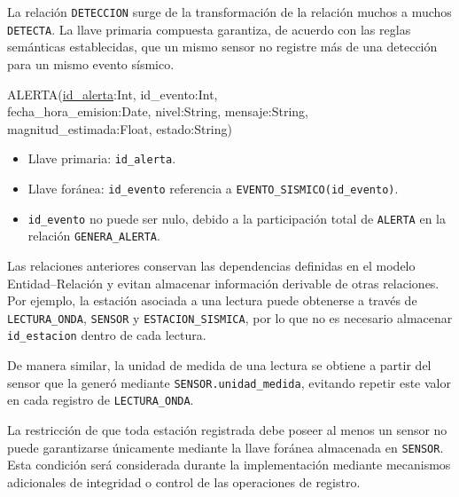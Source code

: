 \documentclass[12pt,a4paper]{article}
\begin{document}
La relación \texttt{DETECCION} surge de la transformación de la relación muchos a muchos \texttt{DETECTA}. La llave primaria compuesta garantiza, de acuerdo con las reglas semánticas establecidas, que un mismo sensor no registre más de una detección para un mismo evento sísmico.

\noindent
\begin{minipage}{\linewidth}
\small\ttfamily\raggedright
ALERTA(\underline{id\_alerta}:Int, id\_evento:Int,\\
fecha\_hora\_emision:Date, nivel:String, mensaje:String,\\
magnitud\_estimada:Float, estado:String)
\end{minipage}
\par\medskip

\begin{itemize}
    \item Llave primaria: \texttt{id\_\allowbreak{}alerta}.
    \item Llave foránea: \texttt{id\_\allowbreak{}evento} referencia a
    \texttt{EVENTO\_\allowbreak{}SISMICO(id\_\allowbreak{}evento)}.
    \item \texttt{id\_\allowbreak{}evento} no puede ser nulo, debido a la participación total de \texttt{ALERTA} en la relación \texttt{GENERA\_\allowbreak{}ALERTA}.
\end{itemize}

Las relaciones anteriores conservan las dependencias definidas en el modelo Entidad--Relación y evitan almacenar información derivable de otras relaciones. Por ejemplo, la estación asociada a una lectura puede obtenerse a través de \texttt{LECTURA\_\allowbreak{}ONDA}, \texttt{SENSOR} y \texttt{ESTACION\_\allowbreak{}SISMICA}, por lo que no es necesario almacenar \texttt{id\_\allowbreak{}estacion} dentro de cada lectura.

De manera similar, la unidad de medida de una lectura se obtiene a partir del sensor que la generó mediante \texttt{SENSOR.unidad\_\allowbreak{}medida}, evitando repetir este valor en cada registro de \texttt{LECTURA\_\allowbreak{}ONDA}.

La restricción de que toda estación registrada debe poseer al menos un sensor no puede garantizarse únicamente mediante la llave foránea almacenada en \texttt{SENSOR}. Esta condición será considerada durante la implementación mediante mecanismos adicionales de integridad o control de las operaciones de registro.

\end{document}
